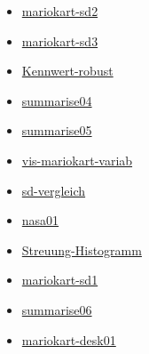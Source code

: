\documentclass[
  a4paper,
]{scrbook}
\providecommand{\tightlist}{%
  \setlength{\itemsep}{0pt}\setlength{\parskip}{0pt}}\usepackage{longtable,booktabs,array}
\theoremstyle{definition}
\theoremstyle{definition}
\theoremstyle{definition}
\theoremstyle{remark}
\begin{document}
\begin{itemize}
\tightlist
\item
  \href{https://datenwerk.netlify.app/posts/mariokart-sd2/mariokart-sd2}{mariokart-sd2}
\item
  \href{https://datenwerk.netlify.app/posts/mariokart-sd3/mariokart-sd3}{mariokart-sd3}
\item
  \href{https://datenwerk.netlify.app/posts/kennwert-robust/kennwert-robust}{Kennwert-robust}
\item
  \href{https://datenwerk.netlify.app/posts/summarise04/summarise04}{summarise04}
\item
  \href{https://datenwerk.netlify.app/posts/summarise05/summarise05}{summarise05}
\item
  \href{https://datenwerk.netlify.app/posts/vis-mariokart-variab/vis-mariokart-variab}{vis-mariokart-variab}
\item
  \href{https://datenwerk.netlify.app/posts/sd-vergleich/sd-vergleich}{sd-vergleich}
\item
  \href{https://datenwerk.netlify.app/posts/nasa01/nasa01}{nasa01}
\item
  \href{https://datenwerk.netlify.app/posts/streuung-histogramm/streuung-histogramm}{Streuung-Histogramm}
\item
  \href{https://datenwerk.netlify.app/posts/mariokart-sd1/mariokart-sd1}{mariokart-sd1}
\item
  \href{https://datenwerk.netlify.app/posts/summarise06/summarise06}{summarise06}
\item
  \href{https://datenwerk.netlify.app/posts/mariokart-desk01/mariokart-desk01}{mariokart-desk01}
\end{itemize}
\end{document}
